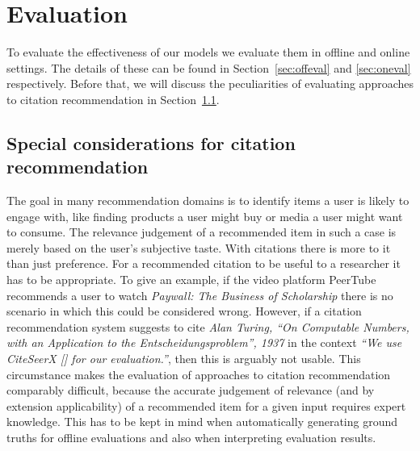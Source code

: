 \chapter{Evaluation}\label{chap:evaluation}
To evaluate the effectiveness of our models we evaluate them in offline and online settings. The details of these can be found in Section~\ref{sec:offeval} and \ref{sec:oneval} respectively. Before that, we will discuss the peculiarities of evaluating approaches to citation recommendation in Section~\ref{sec:citrecspecial}.

\section{Special considerations for citation recommendation}\label{sec:citrecspecial}
The goal in many recommendation domains is to identify items a user is likely to engage with, like finding products a user might buy or media a user might want to consume. The relevance judgement of a recommended item in such a case is merely based on the user's subjective taste.
With citations there is more to it than just preference. For a recommended citation to be useful to a researcher it has to be appropriate. To give an example, if the video platform PeerTube recommends a user to watch \emph{Paywall: The Business of Scholarship} there is no scenario in which this could be considered wrong. However, if a citation recommendation system suggests to cite \emph{Alan Turing, ``On Computable Numbers, with an Application to the Entscheidungsproblem'', 1937} in the context \emph{``We use CiteSeerX [] for our evaluation.''}, then this is arguably not usable. This circumstance makes the evaluation of approaches to citation recommendation comparably difficult, because the accurate judgement of relevance (and by extension applicability) of a recommended item for a given input requires expert knowledge. This has to be kept in mind when automatically generating ground truths for offline evaluations and also when interpreting evaluation results.


